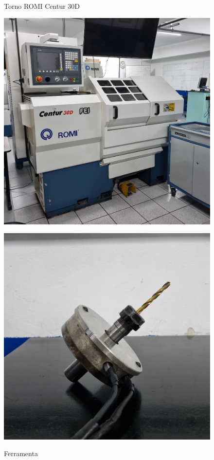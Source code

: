 \documentclass[deposito, acronym, symbols]{fei}
\begin{document}
\begin{figure}[!htp]
  \centering
  \begin{minipage}{0.4\textwidth}
    \centering
    \caption{Torno ROMI Centur 30D}
    \includegraphics[width=1\linewidth]{Imagens/Exp04_torno.jpeg}
    \label{fig:CNC}
  \end{minipage}
  \hfill
  \begin{minipage}{0.4\textwidth}
        \caption{Ferramenta}
    \includegraphics[width=1\linewidth]{Imagens/Exp04_ferramenta.jpeg}
    \label{fig:Ferramenta}
  \end{minipage}
\end{figure}
\end{document}
